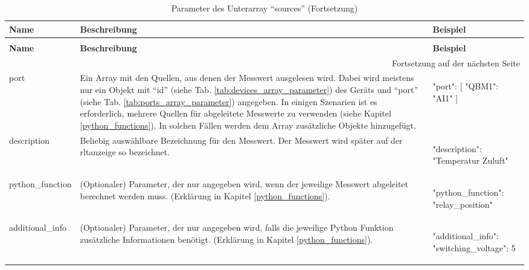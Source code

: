 \begin{enumerate}
   
\begin{longtable}{p{} p{} | p{}}
    \caption{Parameter des Unterarray \enquote{sources}}
    \label{tab:sources_array_parameter}
    \\ \toprule
    \textbf{Name} & \textbf{Beschreibung} & \textbf{Beispiel}
    \\ \midrule
    \endfirsthead
    \caption{Parameter des Unterarray \enquote{sources} (Fortsetzung)}
    \\ \toprule
    \textbf{Name} & \textbf{Beschreibung} & \textbf{Beispiel}
    \\ \midrule
    \endhead
    \midrule
    \multicolumn{3}{r}{{Fortsetzung auf der nächsten Seite}} 
    \\ \bottomrule
    \endfoot
    \bottomrule
    \endlastfoot
    port & Ein Array mit den Quellen, aus denen der Messwert ausgelesen wird. Dabei wird meistens nur ein Objekt mit \enquote{id} (siehe Tab. \ref{tab:devices_array_parameter}) des Geräts und \enquote{port} (siehe Tab. \ref{tab:ports_array_parameter}) angegeben. In einigen Szenarien ist es erforderlich, mehrere Quellen für abgeleitete Messwerte zu verwenden (siehe Kapitel \ref{python_functions}). In solchen Fällen werden dem Array zusätzliche Objekte hinzugefügt. &  
    \begin{jsonTable}
"port": [
    { "QBM1": "AI1" }
]
    \end{jsonTable} 
    \\
    description         & Beliebig auswählbare Bezeichnung für den Messwert. Der Messwert wird später auf der \acs{rltanzeige} so bezeichnet. & 
    \begin{jsonTable}
"description": "Temperatur Zuluft"
    \end{jsonTable}  
    \\
    python\_function    & (Optionaler) Parameter, der nur angegeben wird, wenn der jeweilige Messwert abgeleitet berechnet werden muss. (Erklärung in Kapitel \ref{python_functions}). & 
    \begin{jsonTable}
"python_function": "relay_position"
    \end{jsonTable} 
    \\
    additional\_info    & (Optionaler) Parameter, der nur angegeben wird, falls die jeweilige Python Funktion zusätzliche Informationen benötigt. (Erklärung in Kapitel \ref{python_functions}). & 
    \begin{jsonTable}
"additional_info": { "switching_voltage": 5 }
    \end{jsonTable} 
    \\
\end{longtable}
					
\end{enumerate}

